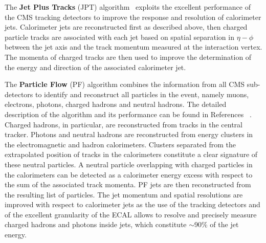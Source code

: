 The {\bf Jet Plus Tracks} (JPT) algorithm~\cite{bib:PAS_jpt} exploits the excellent performance 
of the CMS tracking detectors to improve the \pt response and resolution of calorimeter 
jets. Calorimeter jets are  reconstructed first as described above, then charged 
particle tracks are associated with each jet based on spatial separation in $\eta- \phi$
between the jet axis and the track momentum measured at the interaction vertex. 
The momenta of charged tracks  are then used to improve the determination of the  energy 
and direction of the associated 
calorimeter jet. 

The {\bf Particle Flow} (PF) algorithm combines the information
from all CMS sub-detectors to identify and reconstruct all particles in the event, 
namely muons, electrons, photons, charged hadrons
and neutral hadrons. The detailed description of the algorithm
and its performance can be found in References 
~\cite{bib:PAS_pflow09,bib:PAS_pflow}.
Charged hadrons, in particular, are 
reconstructed from tracks in the central tracker. Photons 
and neutral hadrons are reconstructed from energy clusters in the electromagnetic and 
hadron calorimeters. Clusters separated from the extrapolated position of tracks in the 
calorimeters constitute a clear signature of these neutral particles. A neutral particle 
overlapping with charged particles in the calorimeters can be detected as a calorimeter energy excess 
with respect to the sum of the associated track momenta.  
PF jets are then reconstructed from the resulting list of particles.
The jet momentum and spatial resolutions are 
improved with respect to calorimeter jets
as the use of the tracking detectors and of the excellent granularity of the ECAL 
allows to resolve and precisely measure charged hadrons and photons inside jets,
which constitute $\sim$90\% of the jet energy.  
